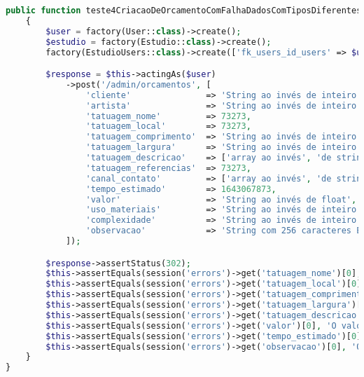 \begin{lstlisting}[language=PHP, caption= Scripts de teste de Criação de Orçamentos, nolol,
label={code:CriacaoDeOrcamentoTest}]
    public function teste4CriacaoDeOrcamentoComFalhaDadosComTiposDiferentesDoSuportado()
    {
        $user = factory(User::class)->create();
        $estudio = factory(Estudio::class)->create();
        factory(EstudioUsers::class)->create(['fk_users_id_users' => $user->id, 'fk_estudio_id_estudio' => $estudio->id_estudio]);

        $response = $this->actingAs($user)
            ->post('/admin/orcamentos', [
                'cliente'               => 'String ao invés de inteiro',
                'artista'               => 'String ao invés de inteiro',
                'tatuagem_nome'         => 73273,
                'tatuagem_local'        => 73273,
                'tatuagem_comprimento'  => 'String ao invés de inteiro',
                'tatuagem_largura'      => 'String ao invés de inteiro',
                'tatuagem_descricao'    => ['array ao invés', 'de string'],
                'tatuagem_referencias'  => 73273,
                'canal_contato'         => ['array ao invés', 'de string'],
                'tempo_estimado'        => 1643067873,
                'valor'                 => 'String ao invés de float',
                'uso_materiais'         => 'String ao invés de inteiro',
                'complexidade'          => 'String ao invés de inteiro',
                'observacao'            => 'String com 256 caracteres ESTETESTETESTETESTETESTETESTETESTETESTETESTETESTETESTETESTETESTETESTETESTETESTETESTETESTETESTETESTETESTETESTETESTETESTETESTETESTETESTETESTETESTETESTETESTETESTETESTETESTETESTETESTETESTETESTETESTETESTETESTETESTETESTETESTETESTETESTET'
            ]);

        $response->assertStatus(302);
        $this->assertEquals(session('errors')->get('tatuagem_nome')[0], 'O campo tatuagem nome deve ser uma string.');
        $this->assertEquals(session('errors')->get('tatuagem_local')[0], 'O campo tatuagem local deve ser uma string.');
        $this->assertEquals(session('errors')->get('tatuagem_comprimento')[0], 'O campo tatuagem comprimento deve ser um número.');
        $this->assertEquals(session('errors')->get('tatuagem_largura')[0], 'O campo tatuagem largura deve ser um número.');
        $this->assertEquals(session('errors')->get('tatuagem_descricao')[0], 'O campo tatuagem descricao deve ser uma string.');
        $this->assertEquals(session('errors')->get('valor')[0], 'O valor do orçamento deve estar entre R$ 0,00 e R$ 99.999,99');
        $this->assertEquals(session('errors')->get('tempo_estimado')[0], 'O tempo estimado deve estar entre 00:00 e 23:59');
        $this->assertEquals(session('errors')->get('observacao')[0], 'O campo observacao não pode ser superior a 255 caracteres.');
    }
}
    
\end{lstlisting}

